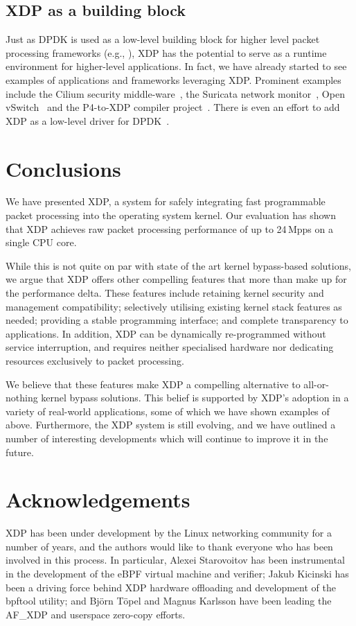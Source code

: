 \documentclass[sigconf]{acmart}
\begin{document}
\subsection{XDP as a building block}
\label{sec:xdp-building-block}

Just as DPDK is used as a low-level building block for higher level packet
processing frameworks (e.g., \cite{linguaglossa2017high}), XDP has the potential
to serve as a runtime environment for higher-level applications. In fact, we
have already started to see examples of applications and frameworks leveraging
XDP. Prominent examples include the Cilium security middle-ware~\cite{cilium},
the Suricata network monitor~\cite{suricata}, Open vSwitch~\cite{ovs-xdp} and
the P4-to-XDP compiler project~\cite{p4xdp}. There is even an effort to add XDP
as a low-level driver for DPDK~\cite{dpdk-xdp}.

\section{Conclusions}
\label{sec:conclusion}
We have presented XDP, a system for safely integrating fast programmable packet
processing into the operating system kernel. Our evaluation has shown that XDP
achieves raw packet processing performance of up to 24\,Mpps on a single CPU
core.

While this is not quite on par with state of the art kernel bypass-based
solutions, we argue that XDP offers other compelling features that more than
make up for the performance delta. These features include retaining kernel
security and management compatibility; selectively utilising existing kernel
stack features as needed; providing a stable programming interface; and complete
transparency to applications. In addition, XDP can be dynamically re-programmed
without service interruption, and requires neither specialised hardware nor
dedicating resources exclusively to packet processing.

We believe that these features make XDP a compelling alternative to
all-or-nothing kernel bypass solutions. This belief is supported by XDP's
adoption in a variety of real-world applications, some of which we have shown
examples of above. Furthermore, the XDP system is still evolving, and we have
outlined a number of interesting developments which will continue to improve it
in the future.

\section*{Acknowledgements}
\label{sec:acknowledgements}
XDP has been under development by the Linux networking community for a number of
years, and the authors would like to thank everyone who has been involved in
this process. In particular, Alexei Starovoitov has been instrumental in the
development of the eBPF virtual machine and verifier; Jakub Kicinski has been a
driving force behind XDP hardware offloading and development of the bpftool
utility; and Björn Töpel and Magnus Karlsson have been leading the AF\_XDP and
userspace zero-copy efforts.




\end{document}
